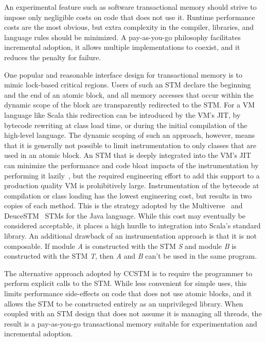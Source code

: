 
An experimental feature such as software transactional memory should
strive to impose only negligible costs on code that does not use it.
Runtime performance costs are the most obvious, but extra complexity in
the compiler, libraries, and language rules should be minimized.
A pay-as-you-go philosophy facilitates incremental adoption, it allows
multiple implementations to coexist, and it reduces the penalty for
failure.

One popular and reasonable interface design for transactional memory
is to mimic lock-based critical regions.  Users of such an STM declare
the beginning and the end of an atomic block, and all memory accesses
that occur within the dynamic scope of the block are transparently
redirected to the STM.  For a VM language like Scala this redirection
can be introduced by the VM's JIT, by bytecode rewriting at class
load time, or during the initial
compilation of the high-level language.  The dynamic scoping of such an approach,
however, means that it is generally not possible to
limit instrumentation to only classes that are used in an atomic block.
An STM that is deeply integrated into the VM's JIT can minimize the
performance and code bloat impacts of the instrumentation by performing it
lazily~\cite{??}, but the required engineering effort to add this support
to a production quality VM is prohibitively large.  Instrumentation of
the bytecode at compilation or class loading has the lowest engineering
cost, but results in two copies of each method.
This is the strategy adopted by the Multiverse~\cite{multiverse} and
DeuceSTM~\cite{deucestm} STMs for the Java language.
While this cost may eventually be considered acceptable, it places a
high hurdle to integration into Scala's standard library.
An additional drawback of
an instrumentation approach is that it is not composable.  If module
\textit{A} is constructed with the STM \textit{S} and module \textit{B}
is constructed with the STM \textit{T}, then \textit{A} and \textit{B}
can't be used in the same program.

The alternative approach adopted by CCSTM is to require the programmer to perform
explicit calls to the STM.  While less convenient for simple uses, this
limits performance side-effects on code that does not use atomic blocks, and it
allows the STM to be constructed entirely as an unprivileged library.
When coupled with an STM design that does not assume it is managing all
threads, the result is a pay-as-you-go transactional memory suitable
for experimentation and incremental adoption.


